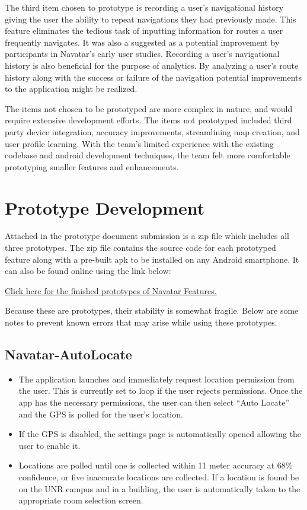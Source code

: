 \documentclass{scrreprt}
\begin{document}
The third item chosen to prototype is recording a user’s navigational history giving the user the ability to repeat navigations they had previously made. This feature eliminates the tedious task of inputting information for routes a user frequently navigates. It was also a suggested as a potential improvement by participants in Navatar’s early user studies. Recording a user’s navigational history is also beneficial for the purpose of analytics. By analyzing a user's route history along with the success or failure of the navigation potential improvements to the application might be realized.

The items not chosen to be prototyped are more complex in nature, and would require extensive development efforts. The items not prototyped included third party device integration, accuracy improvements, streamlining map creation, and user profile learning. With the team's limited experience with the existing codebase and android development techniques, the team felt more comfortable prototyping smaller features and enhancements.

\chapter{Prototype Development}

Attached in the prototype document submission is a zip file which includes all three prototypes. The zip file contains the source code for each prototyped feature along with a pre-built apk to be installed on any Android smartphone. It can also be found online using the link below:

\href{https://drive.google.com/file/d/0B8OVy1TIf-6_b2NFTFRia2ZFZFE/view}{Click here for the finished prototypes of Navatar Features.}

Because these are prototypes, their stability is somewhat fragile. Below are some notes to prevent known errors that may arise while using these prototypes.

\section{Navatar-AutoLocate}
	\begin{itemize}
		\item The application launches and immediately request location permission from the user. This is currently set to loop if the user rejects permissions. Once the app has the necessary permissions, the user can then select “Auto Locate” and the GPS is polled for the user’s location. 
		\item If the GPS is disabled, the settings page is automatically opened allowing the user to enable it. 
		\item Locations are polled until one is collected within 11 meter accuracy at 68\% confidence, or five inaccurate locations are collected. If a location is found be on the UNR campus and in a building, the user is automatically taken to the appropriate room selection screen.
	\end{itemize}
	
\end{document}
